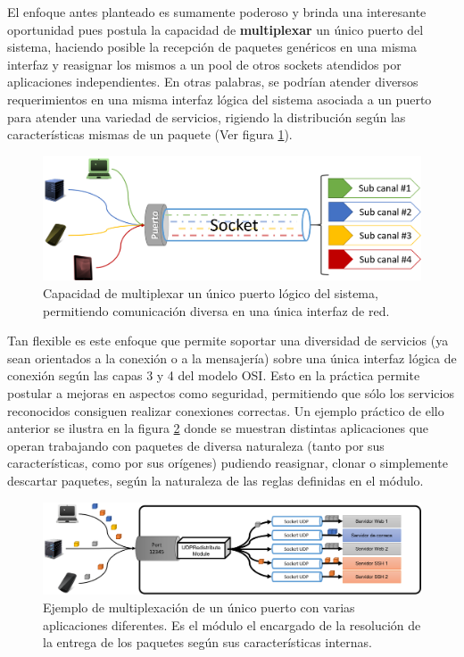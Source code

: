 El enfoque antes planteado es sumamente poderoso y brinda una interesante oportunidad pues postula la capacidad de \textbf{multiplexar} un único puerto del sistema, haciendo posible la recepción de paquetes genéricos en una misma interfaz y reasignar los mismos a un pool de otros sockets atendidos por aplicaciones independientes. En otras palabras, se podrían atender diversos requerimientos en una misma interfaz lógica del sistema asociada a un puerto para atender una variedad de servicios, rigiendo la distribución según las características mismas de un paquete (Ver figura \ref{fig:multiplexarPuerto}).

\begin{figure}[!h]
	\centering
	\includegraphics[scale=.5]{imagenes/socketMultiplexed.png}
	\caption{Capacidad de multiplexar un único puerto lógico del sistema, permitiendo comunicación diversa en una única interfaz de red.}
	\label{fig:multiplexarPuerto}
\end{figure}

Tan flexible es este enfoque que permite soportar una diversidad de servicios (ya sean orientados a la conexión o a la mensajería) sobre una única interfaz lógica de conexión según las capas 3 y 4 del modelo OSI. Esto en la práctica permite postular a mejoras en aspectos como seguridad, permitiendo que sólo los servicios reconocidos consiguen realizar conexiones correctas. Un ejemplo práctico de ello anterior se ilustra en la figura \ref{fig:multiplexarPuertoEjemplo} donde se muestran distintas aplicaciones que operan trabajando con paquetes de diversa naturaleza (tanto por sus características, como por sus orígenes) pudiendo reasignar, clonar o simplemente descartar paquetes, según la naturaleza de las reglas definidas en el módulo.

\begin{figure}[!h]
	\centering
	\includegraphics[scale=.6]{imagenes/udpredistributeapplications.png}
	\caption{Ejemplo de multiplexación de un único puerto con varias aplicaciones diferentes. Es el módulo el encargado de la resolución de la entrega de los paquetes según sus características internas.}
	\label{fig:multiplexarPuertoEjemplo}
\end{figure}

